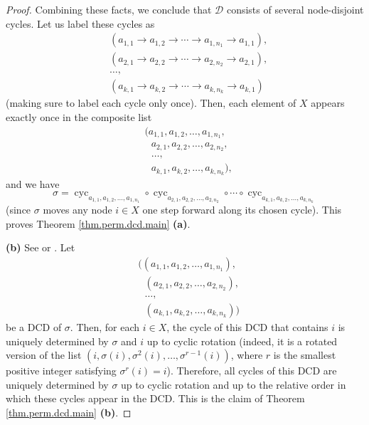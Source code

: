 \begin{proof}
Combining these facts, we conclude that $\mathcal{D}$ consists of several
node-disjoint cycles. Let us label these cycles as%
\begin{align*}
&  \left(  a_{1,1}\rightarrow a_{1,2}\rightarrow\cdots\rightarrow a_{1,n_{1}%
}\rightarrow a_{1,1}\right)  ,\\
&  \left(  a_{2,1}\rightarrow a_{2,2}\rightarrow\cdots\rightarrow a_{2,n_{2}%
}\rightarrow a_{2,1}\right)  ,\\
&  \ldots,\\
&  \left(  a_{k,1}\rightarrow a_{k,2}\rightarrow\cdots\rightarrow a_{k,n_{k}%
}\rightarrow a_{k,1}\right)
\end{align*}
(making sure to label each cycle only once). Then, each element of $X$ appears
exactly once in the composite list%
\begin{align*}
&  (a_{1,1},a_{1,2},\ldots,a_{1,n_{1}},\\
&  \ \ \ a_{2,1},a_{2,2},\ldots,a_{2,n_{2}},\\
&  \ \ \ \ldots,\\
&  \ \ \ a_{k,1},a_{k,2},\ldots,a_{k,n_{k}}),
\end{align*}
and we have%
\[
\sigma=\operatorname*{cyc}\nolimits_{a_{1,1},a_{1,2},\ldots,a_{1,n_{1}}}%
\circ\operatorname*{cyc}\nolimits_{a_{2,1},a_{2,2},\ldots,a_{2,n_{2}}}%
\circ\cdots\circ\operatorname*{cyc}\nolimits_{a_{k,1},a_{k,2},\ldots
,a_{k,n_{k}}}%
\]
(since $\sigma$ moves any node $i\in X$ one step forward along its chosen
cycle). This proves Theorem \ref{thm.perm.dcd.main} \textbf{(a)}.

\medskip

\textbf{(b)} See \cite[Theorem 1.5.3]{Goodman} or \cite[Chapter I, \S 5.7,
Proposition 7]{Bourba74}. Let%
\begin{align*}
&  \Big(\left(  a_{1,1},a_{1,2},\ldots,a_{1,n_{1}}\right)  ,\\
&  \ \ \ \left(  a_{2,1},a_{2,2},\ldots,a_{2,n_{2}}\right)  ,\\
&  \ \ \ \ldots,\\
&  \ \ \ \left(  a_{k,1},a_{k,2},\ldots,a_{k,n_{k}}\right)  \Big)
\end{align*}
be a DCD of $\sigma$. Then, for each $i\in X$, the cycle of this DCD that
contains $i$ is uniquely determined by $\sigma$ and $i$ up to cyclic rotation
(indeed, it is a rotated version of the list $\left(  i,\sigma\left(
i\right)  ,\sigma^{2}\left(  i\right)  ,\ldots,\sigma^{r-1}\left(  i\right)
\right)  $, where $r$ is the smallest positive integer satisfying $\sigma
^{r}\left(  i\right)  =i$). Therefore, all cycles of this DCD are uniquely
determined by $\sigma$ up to cyclic rotation and up to the relative order in
which these cycles appear in the DCD. This is the claim of
Theorem \ref{thm.perm.dcd.main} \textbf{(b)}.


\end{proof}
